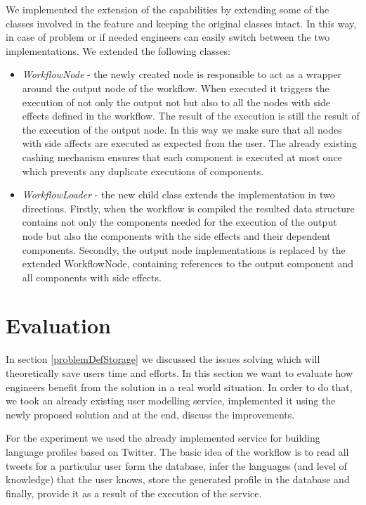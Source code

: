 We implemented the extension of the capabilities by extending some of the classes involved in the feature and keeping the original classes intact. In this way, in case of problem or if needed engineers can easily switch between the two implementations. We extended the following classes:

\begin{itemize}
	\item \textit{WorkflowNode} - the newly created node is responsible to act as a wrapper around the output node of the workflow. When executed it triggers the execution of not only the output not but also to all the nodes with side effects defined in the workflow. The result of the execution is still the result of the execution of the output node. In this way we make sure that all nodes with side affects are executed as expected from the user. The already existing cashing mechanism ensures that each component is executed at most once which prevents any duplicate executions of components.
	
	\item \textit{WorkflowLoader} - the new child class extends the implementation in two directions. Firstly, when the workflow is compiled the resulted data structure contains not only the components needed for the execution of the output node but also the components with the side effects and their dependent components. Secondly, the output node implementations is replaced by the extended WorkflowNode, containing references to the output component and all components with side effects.
\end{itemize}


\section{Evaluation} 
\label{sec:evalStorage}

In section \ref{problemDefStorage} we discussed the issues solving which will theoretically save users time and efforts. In this section we want to evaluate how engineers benefit from the solution in a real world situation. In order to do that, we took an already existing user modelling service, implemented it using the newly proposed solution and at the end, discuss the improvements. 

For the experiment we used the already implemented service for building language profiles based on Twitter. The basic idea of the workflow is to read all tweets for a particular user form the database, infer the languages (and level of knowledge) that the user knows, store the generated profile in the database and finally, provide it as a result of the execution of the service.

